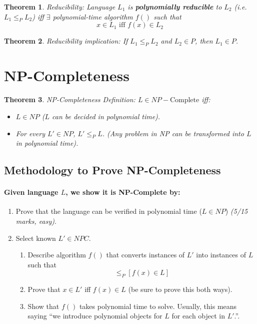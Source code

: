 \documentclass[a4paper,12pt]{report}
\newtheorem{theorem}{Theorem}
\begin{document}
\begin{theorem}{Reducibility: }
Language $L_1$ is \textbf{polynomially reducible} to $L_2$ (i.e. $L_1 \leq_P L_2$) iff $\exists$ polynomial-time algorithm $f()$ such that 
\begin{equation}
x\in L_1 \text{ iff } f(x) \in L_2
\end{equation}
\end{theorem}


\begin{theorem}{Reducibility implication: }
If $L_1 \leq_P L_2$ and $L_2\in P$, then $L_1\in P$.
\end{theorem}


\section{NP-Completeness}

\begin{theorem}{NP-Completeness Definition: }
$L\in NP-\text{Complete}$ iff:
\begin{itemize}
\item $L\in NP$ ($L$ can be decided in polynomial time).
\item For every $L'\in NP$, $L'\leq_P L$. (Any problem in NP can be transformed into $L$ in polynomial time). 
\end{itemize}
\end{theorem}


\subsection{Methodology to Prove NP-Completeness}

\paragraph{Given language $L$, we show it is NP-Complete by:} 
\begin{enumerate}
\item Prove that the language can be verified in polynomial time ($L\in NP$) \textit{(5/15 marks, easy)}.
\item Select known $L'\in NPC$.
\begin{enumerate}
\item Describe algorithm $f()$ that converts instances of $L'$ into instances of $L$ such that 
\begin{equation}
[x\in L'] \leq_P [f(x)\in L]
\end{equation}
\item Prove that $x\in L'$ iff $f(x)\in L$ (be sure to prove this both ways).
\item Show that $f()$ takes polynomial time to solve. Usually, this means saying ``we introduce polynomial objects for $L$ for each object in $L'$.''. 
\end{enumerate}
\end{enumerate}
\end{document}
